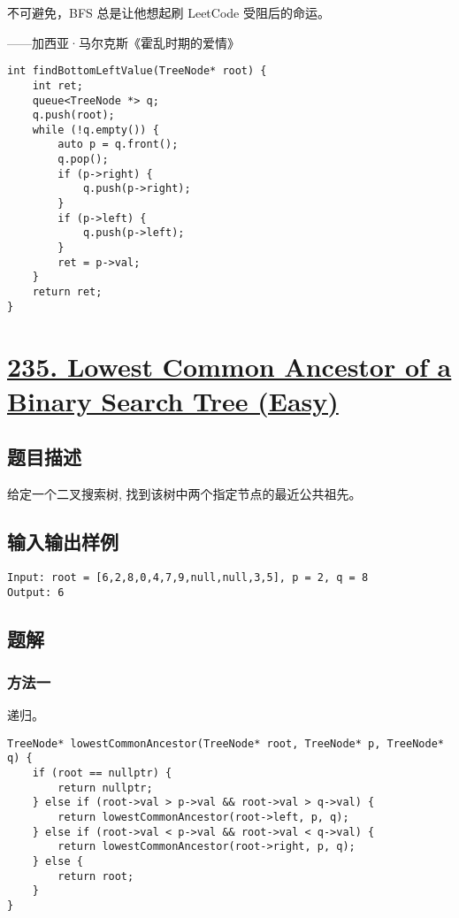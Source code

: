 \documentclass[lang=cn,10pt]{elegantbook}
\begin{document}
不可避免，BFS 总是让他想起刷 LeetCode 受阻后的命运。

——加西亚·马尔克斯《霍乱时期的爱情》

\begin{lstlisting}
int findBottomLeftValue(TreeNode* root) {
	int ret;
	queue<TreeNode *> q;
	q.push(root);
	while (!q.empty()) {
		auto p = q.front();
		q.pop();
		if (p->right) {
			q.push(p->right);
		}
		if (p->left) {
			q.push(p->left);
		}
		ret = p->val;
	}
	return ret;
}
\end{lstlisting}

{\color{red}\section{\href{https://leetcode.cn/problems/lowest-common-ancestor-of-a-binary-search-tree/}{235. Lowest Common Ancestor of a Binary Search Tree (Easy)}}} \label{ch14.235}

\subsection*{题目描述}

给定一个二叉搜索树, 找到该树中两个指定节点的最近公共祖先。

\subsection*{输入输出样例}

\begin{lstlisting}
Input: root = [6,2,8,0,4,7,9,null,null,3,5], p = 2, q = 8
Output: 6
\end{lstlisting}

\subsection*{题解}

\subsubsection*{方法一}

递归。

\begin{lstlisting}
TreeNode* lowestCommonAncestor(TreeNode* root, TreeNode* p, TreeNode* q) {
	if (root == nullptr) {
		return nullptr;
	} else if (root->val > p->val && root->val > q->val) {
		return lowestCommonAncestor(root->left, p, q);
	} else if (root->val < p->val && root->val < q->val) {
		return lowestCommonAncestor(root->right, p, q);
	} else {
		return root;
	}
}
\end{lstlisting}
\end{document}
